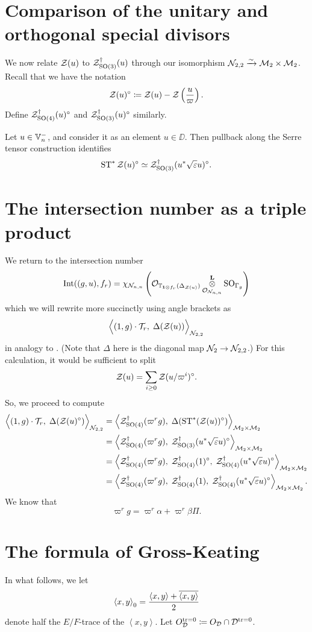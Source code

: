 \section{Comparison of the unitary and orthogonal special divisors}
We now relate $\mathcal Z(u)$ to $\mathcal Z^{\dagger}_{\operatorname{SO}(3)}(u)$ through our
isomorphism $\mathcal N_{2,2} \xrightarrow{\sim} \mathcal M_2 \times \mathcal M_2$.
Recall that we have the notation
\[ \mathcal Z(u)^\circ \coloneqq \mathcal Z(u) - \mathcal Z\left( \frac{u}{\varpi} \right). \]
Define $\mathcal Z^{\dagger}_{\operatorname{SO}(4)}(u)^\circ$ and $\mathcal Z^{\dagger}_{\operatorname{SO}(3)}(u)^\circ$ similarly.

\begin{conjecture}
  Let $u \in \mathbb V_n^-$, and consider it as an element $u \in \DD$.
  Then pullback along the Serre tensor construction identifies
  \[ \operatorname{ST}^\ast \mathcal Z(u)^\circ \simeq \mathcal Z^{\dagger}_{\operatorname{SO}(3)}(u^\ast \sqrt{\varepsilon} u)^\circ. \]
\end{conjecture}

\section{The intersection number as a triple product}
We return to the intersection number
\[ \operatorname{Int}((g,u), f_r) = \chi_{\mathcal N_{n,n}} \left(
      \mathcal{O}_{\mathbb T_{\mathbf{1} \otimes f_r}(\Delta_{\mathcal Z(u)})}
      \mathop{\otimes}^{\mathbf{L}}_{\mathcal{O}_{\mathcal N_{n,n}}} \operatorname{SO}_{\Gamma_g} \right) \]
which we will rewrite more succinctly using angle brackets as
\[ \Big\langle (1,g) \cdot \mathcal{T}_r, \; \Delta(\mathcal Z(u)) \Big\rangle_{\mathcal N_{2,2}} \]
in analogy to \cite[\S6.1]{ref:AFLspherical}.
(Note that $\Delta$ here is the diagonal map $\mathcal N_2 \to \mathcal N_{2,2}$.)
For this calculation, it would be sufficient to split
\[ \mathcal Z(u) = \sum_{i \ge 0} \mathcal Z(u/\varpi^i)^\circ. \]
So, we proceed to compute
\begin{align*}
  \Big\langle (1,g) \cdot \mathcal{T}_r, \; \Delta(\mathcal Z(u)^\circ) \Big\rangle_{\mathcal N_{2,2}}
  &= \left< \mathcal Z^{\dagger}_{\operatorname{SO}(4)}(\varpi^r g), \; \Delta(\operatorname{ST}^\ast(\mathcal Z(u))^\circ) \right>_{\mathcal M_2 \times \mathcal M_2} \\
  &= \left< \mathcal Z^{\dagger}_{\operatorname{SO}(4)}(\varpi^r g), \; \mathcal Z^{\dagger}_{\operatorname{SO}(3)}(u^\ast \sqrt{\varepsilon} u)^\circ \right>_{\mathcal M_2 \times \mathcal M_2} \\
  &= \left< \mathcal Z^{\dagger}_{\operatorname{SO}(4)}(\varpi^r g), \; \mathcal Z^{\dagger}_{\operatorname{SO}(4)}(1)^\circ, \; \mathcal Z^{\dagger}_{\operatorname{SO}(4)}(u^\ast \sqrt{\varepsilon} u)^\circ \right>_{\mathcal M_2 \times \mathcal M_2} \\
  &= \left< \mathcal Z^{\dagger}_{\operatorname{SO}(4)}(\varpi^r g), \; \mathcal Z^{\dagger}_{\operatorname{SO}(4)}(1), \; \mathcal Z^{\dagger}_{\operatorname{SO}(4)}(u^\ast \sqrt{\varepsilon} u)^\circ \right>_{\mathcal M_2 \times \mathcal M_2}.
\end{align*}
We know that
\[ \varpi^r g = \varpi^r \alpha + \varpi^r \beta \Pi. \]
\section{The formula of Gross-Keating}
\label{sec:GK}
In what follows, we let
\[ \left\langle x, y \right\rangle _0
  = \frac{\left\langle x,y \right\rangle + \overline{\left\langle x,y \right\rangle}}{2} \]
denote half the $E/F$-trace of the $\left\langle x,y \right\rangle$.
Let $O_\mathcal D^{\operatorname{tr} = 0} \coloneqq O_\mathcal D \cap \mathcal D^{\operatorname{tr} = 0}$.

